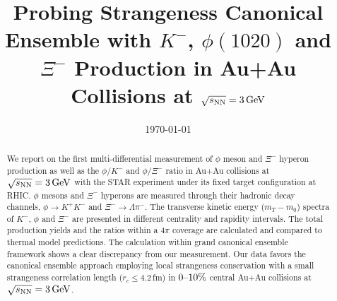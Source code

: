 \documentclass[%
 reprint,	
showpacs,
 amsmath,amssymb,
 aps,
 superscriptaddress,
]{revtex4-1}
\begin{document}

\title{Probing Strangeness Canonical Ensemble with $K^{-}$, $\phi(1020)$ and $\Xi^{-}$ Production in Au+Au Collisions at ${\sqrt{s_{\rm NN}} = \rm{3\,GeV}}$}%



\date{\today}%

\begin{abstract}


We report on the first multi-differential measurement of $\phi$ meson and $\Xi^{-}$ hyperon production as well as the $\phi/K^-$ and $\phi/\Xi^-$ ratio in Au+Au collisions at ${\sqrt{s_{\rm NN}} = \rm{3\,GeV}}$ with the STAR experiment under its fixed target configuration at RHIC. $\phi$ mesons and $\Xi^{-}$ hyperons are measured through their hadronic decay channels, $\phi\rightarrow K^+K^-$ and $\Xi^-\rightarrow \Lambda\pi^-$. The transverse kinetic energy ($m_T - m_0$) spectra of $K^-$, $\phi$ and $\Xi^{-}$ are presented in different centrality and rapidity intervals. The total production yields and the ratios within a $4\pi$ coverage are calculated and compared to thermal model predictions. The calculation within grand canonical ensemble framework shows a clear discrepancy from our measurement. Our data favors the canonical ensemble approach employing local strangeness conservation with a small strangeness correlation length ($r_c \leq 4.2$\,fm) in $\textup{0--10\%}$ central Au+Au collisions at ${\sqrt{s_{\rm NN}} = \rm{3\,GeV}}$.


\end{abstract}
\end{document}
